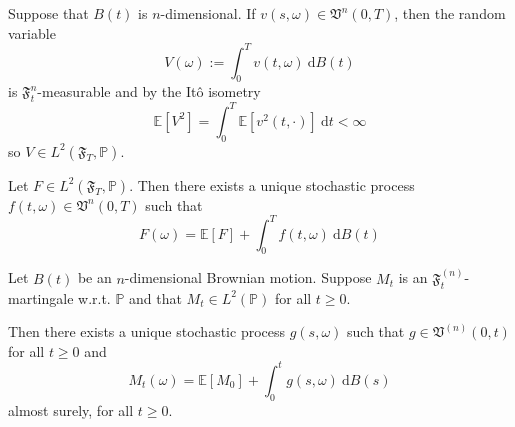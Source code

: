 Suppose that $B(t)$ is $n$-dimensional. If $v(s, \omega) \in \mathfrak{V}^n(0,T)$, then the random variable
\begin{equation*}
    V(\omega) := \int_0^T v(t, \omega) ~\mathrm{d}B(t)
\end{equation*}
is $\mathfrak{F}_t^n$-measurable and by the Itô isometry
\begin{equation*}
    \mathbb{E}[V^2] = \int_0^T \mathbb{E}[v^2(t, \cdot)] ~\mathrm{d}t < \infty
\end{equation*}
so $V \in L^2(\mathfrak{F}_T, \mathbb{P})$.

\begin{theorem}
    Let $F \in L^2(\mathfrak{F}_T, \mathbb{P})$. Then there exists a unique stochastic process $f(t, \omega) \in \mathfrak{V}^n(0, T)$ such that
    \begin{equation*}
        F(\omega) = \mathbb{E}[F] + \int_0^T f(t, \omega) ~\mathrm{d}B(t)
    \end{equation*}
\end{theorem}

\begin{theorem}\label{thm:martingale_representation}
    Let $B(t)$ be an $n$-dimensional Brownian motion. Suppose $M_t$ is an $\mathfrak{F}_t^{(n)}$-martingale w.r.t. $\mathbb{P}$ and that $M_t \in L^2(\mathbb{P})$ for all $t \geq 0$.

    Then there exists a unique stochastic process $g(s, \omega)$ such that $g \in \mathfrak{V}^{(n)}(0, t)$ for all $t \geq 0$ and 
    \begin{equation*}
        M_t(\omega) = \mathbb{E}[M_0] + \int_0^t g(s, \omega) ~\mathrm{d}B(s)
    \end{equation*}
    almost surely, for all $t \geq 0$.
\end{theorem}